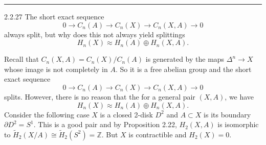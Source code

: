 \documentclass[a4paper, 12pt]{article}
\begin{document}
\noindent\rule{7in}{2.8pt}
\begin{problem}{2.2.27}
The short exact sequence 
\[0\rightarrow C_n(A)\rightarrow C_n(X)\rightarrow C_n(X,A)\rightarrow 0\]
always split, but why does this not always yield splittings 
\[H_n(X)\approx H_n(A)\oplus H_n(X,A).\]
\end{problem}
\begin{solution}
Recall that \(C_n(X,A)=C_n(X)/C_n(A)\) is generated by the maps \(\Delta^n\rightarrow X\) whose image is not completely in \(A\). So it is a free abelian group and the short exact sequence 
\[0\rightarrow C_n(A)\rightarrow C_n(X)\rightarrow C_n(X,A)\rightarrow 0\]
splits. However, there is no reason that the for a general pair \((X,A)\), we have 
\[H_n(X)\approx H_n(A)\oplus H_n(X,A).\]
Consider the following case \(X\) is a closed 2-disk \(D^2\) and \(A\subset X\) is its boundary \(\partial D^2=S^1\). This is a good pair and by Proposition 2.22, \(H_2(X,A)\) is isomorphic to 
\(\tilde{H}_2(X/A)\cong \tilde{H}_2(S^2)=\mathbb{Z}\). But \(X\) is contractible and \(H_2(X)=0\).
\end{solution}
\end{document}

